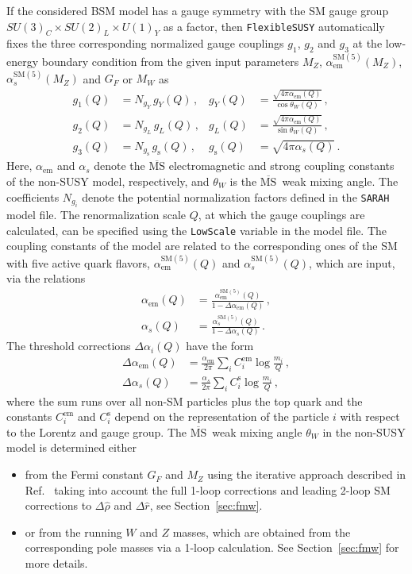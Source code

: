 \documentclass[final,3p,11pt,pdflatex]{elsarticle}
\makeatletter
\newcommand{\sarah}{\texttt{SARAH}\@\xspace}
\newcommand{\fs}{\texttt{FlexibleSUSY}\@\xspace}
\newcommand{\code}[1]{\lstinline|#1|}  %
\newcommand{\ol}[1]{\overline{#1}}
\newcommand{\MSbar}{\ensuremath{\ol{\text{MS}}}\xspace}
\newcommand{\SM}{\ensuremath{\text{SM}}\xspace}
\newcommand{\secref}[1]{Section~\ref{#1}}
\def\as{\alpha_s}
\def\aem{\alpha_{\text{em}}}
\makeatother
\begin{document}
If the considered BSM model has a gauge symmetry with the SM gauge group $SU(3)_C\times SU(2)_L\times U(1)_Y$ as a factor,
then \fs automatically fixes the three corresponding normalized gauge
couplings $g_1$, $g_2$ and $g_3$ at the low-energy boundary condition
from the given input parameters $M_Z$, $\aem^{\SM(5)}(M_Z)$,
$\as^{\SM(5)}(M_Z)$ and $G_F$ or $M_W$ as
%
\begin{align}
  g_1(Q) &= N_{g_Y} \, g_Y(Q) \,,
  & g_Y(Q) &= \frac{\sqrt{4\pi\aem(Q)}}{\cos\theta_W(Q)} \,,\\
  g_2(Q) &= N_{g_L} \, g_L(Q) \,,
  & g_L(Q) &= \frac{\sqrt{4\pi\aem(Q)}}{\sin\theta_W(Q)} \,,\\
  g_3(Q) &= N_{g_{\text{s}}} \, g_{\text{s}}(Q) \,,
  & g_{\text{s}}(Q) &= \sqrt{4\pi\as(Q)} \,.
\end{align}
%
Here, $\aem$ and $\as$
denote the \MSbar electromagnetic and strong coupling constants of the
non-SUSY model, respectively, and $\theta_W$ is the \MSbar\ weak
mixing angle.  The coefficients $N_{g_i}$ denote the potential
normalization factors defined in the \sarah model file.  The
renormalization scale $Q$, at which the gauge couplings are calculated,
can be specified using the \code{LowScale} variable in the model file.
The coupling constants of the model are related to the corresponding
ones of the SM with five active quark flavors,
$\aem^{\SM(5)}(Q)$ and $\as^{\SM(5)}(Q)$, which are input,
via the relations
%
\begin{align}
  \aem(Q) &=
  \frac{\aem^{\SM(5)}(Q)}{1 - \Delta\aem(Q)} \,,\\
  \as(Q) &=
  \frac{\as^{\SM(5)}(Q)}{1 - \Delta\as(Q)} \,.
\end{align}
%
The threshold corrections $\Delta\alpha_i(Q)$ have the form
%
\begin{align}
  \Delta\aem(Q) &=
  \frac{\aem}{2\pi} \sum_i C_i^{\text{em}} \log\frac{m_i}{Q}
  \,,\label{eq:alpha_em_general_threshold} \\
  \Delta\as(Q) &=
  \frac{\as}{2\pi} \sum_i C_i^{\text{s}} \log\frac{m_i}{Q} \,,
\end{align}
%
where the sum runs over all non-SM particles plus the top quark and
the constants $C_i^{\text{em}}$ and $C_i^{\text{s}}$ depend on the
representation of the particle $i$ with respect to the Lorentz and gauge group.
%
The \MSbar\ weak mixing angle $\theta_W$ in the non-SUSY model is
determined either
%
\begin{itemize}
\item from the Fermi constant $G_F$ and $M_Z$ using the iterative
  approach described in Ref.~\cite{Degrassi:1990tu} taking into account the
  full 1-loop corrections and leading 2-loop SM
  corrections to $\Delta\hat{\rho}$ and $\Delta\hat{r}$, see
  \secref{sec:fmw}.
\item or from the running $W$ and $Z$ masses, which
  are obtained from the corresponding pole masses via a 1-loop
  calculation.  See \secref{sec:fmw} for more details.
\end{itemize}
\end{document}
